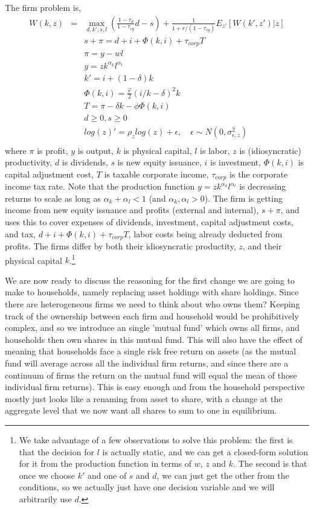 The firm problem is,
\begin{eqnarray*}
 W(k,z)&=& \max_{d,k',s,l} \left( \frac{1-\tau_d}{1-\tau_{cg}} d  -s \right)+ \frac{1}{1+r/(1-\tau_{cg})} E_{z'}[W(k',z')|z] \\
 && s + \pi = d + i + \Phi(k,i) + \tau_{corp} T \\
&& \pi = y -w l \\
&& y=z k^{\alpha_k} l^{\alpha_l} \\
&& k'= i+(1-\delta)k \\
&& \Phi(k,i)=\frac{\varphi}{2} (i/k-\delta)^2 k \\
&& T= \pi -\delta k - \phi \Phi(k,i) \\
&& d \geq 0, s \geq 0 \\
&& log(z)'=\rho_{z} log(z) + \epsilon, \quad \epsilon \sim N(0,\sigma_{\epsilon,z}^2) \\
\end{eqnarray*}
where $\pi$ is profit, $y$ is output, $k$ is physical capital, $l$ is labor, $z$ is (idiosyncratic) productivity, $d$ is dividends, $s$ is new equity issuance, $i$ is investment, $\Phi(k,i)$ is capital adjustment cost, $T$ is taxable corporate income, $\tau_{corp}$ is the corporate income tax rate. Note that the production function $y=z k^{\alpha_k} l^{\alpha_l}$ is decreasing returns to scale as long as $\alpha_k+\alpha_l<1$ (and $\alpha_k,\alpha_l>0$). The firm is getting income from new equity issuance and profits (external and internal), $s + \pi$, and uses this to cover expenses of dividends, investment, capital adjustment costs, and tax, $d + i + \Phi(k,i) + \tau_{corp} T$, labor costs being already deducted from profits. The firms differ by both their idiosyncratic productity, $z$, and their physical capital $k$.\footnote{We take advantage of a few observations to solve this problem: the first is that the decision for $l$ is actually static, and we can get a closed-form solution for it from the production function in terms of $w$, $z$ and $k$. The second is that once we choose $k'$ and one of $s$ and $d$, we can just get the other from the conditions, so we actually just have one decision variable and we will arbitrarily use $d$.}

We are now ready to discuss the reasoning for the first change we are going to make to households, namely replacing asset holdings with share holdings. Since there are heterogeneous firms we need to think about who owns them? Keeping track of the ownership between each firm and household would be prohibitively complex, and so we introduce an single 'mutual fund' which owns all firms, and households then own shares in this mutual fund. This will also have the effect of meaning that households face a single risk free return on assets (as the mutual fund will average across all the individual firm returns, and since there are a continuum of firms the return on the mutual fund will equal the mean of those individual firm returns). This is easy enough and from the household perspective mostly just looks like a renaming from asset to share, with a change at the aggregate level that we now want all shares to sum to one in equilibrium.

